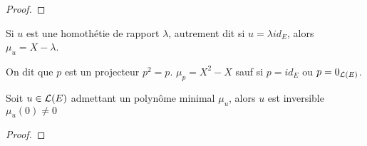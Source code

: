 \begin{proof}
\end{proof}

\begin{example}
	Si $u$ est une homothétie de rapport $\lambda$, autrement dit si $u = \lambda id_E$, alors $\mu_u = X - \lambda$.
\end{example}

\begin{remarque}
	On dit que $p$ est un projecteur \ssi ${p}^2 = p$.
	$\mu_p = X^2 - X$ sauf si $p = id_E$ ou $p = 0_{\mathcal{L}(E)}$.
\end{remarque}

\begin{prop}
	Soit $u \in \mathcal{L}(E)$ admettant un polynôme minimal $\mu_u$, alors $u$ est inversible \ssi $\mu_u(0) \neq 0$
\end{prop}

\begin{proof}
\end{proof}
